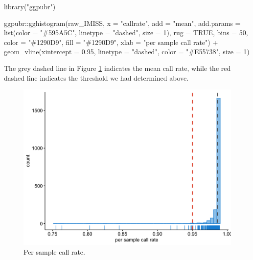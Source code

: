 \documentclass[
]{book}
\newenvironment{Shaded}{\begin{snugshade}}{\end{snugshade}}
\newcommand{\AttributeTok}[1]{\textcolor[rgb]{0.77,0.63,0.00}{#1}}
\newcommand{\ConstantTok}[1]{\textcolor[rgb]{0.00,0.00,0.00}{#1}}
\newcommand{\DecValTok}[1]{\textcolor[rgb]{0.00,0.00,0.81}{#1}}
\newcommand{\FloatTok}[1]{\textcolor[rgb]{0.00,0.00,0.81}{#1}}
\newcommand{\FunctionTok}[1]{\textcolor[rgb]{0.00,0.00,0.00}{#1}}
\newcommand{\NormalTok}[1]{#1}
\newcommand{\SpecialCharTok}[1]{\textcolor[rgb]{0.00,0.00,0.00}{#1}}
\newcommand{\StringTok}[1]{\textcolor[rgb]{0.31,0.60,0.02}{#1}}
\begin{document}
\begin{Shaded}
\begin{Highlighting}[]
\FunctionTok{library}\NormalTok{(}\StringTok{"ggpubr"}\NormalTok{)}

\NormalTok{ggpubr}\SpecialCharTok{::}\FunctionTok{gghistogram}\NormalTok{(raw\_IMISS, }\AttributeTok{x =} \StringTok{"callrate"}\NormalTok{,}
                    \AttributeTok{add =} \StringTok{"mean"}\NormalTok{, }\AttributeTok{add.params =} \FunctionTok{list}\NormalTok{(}\AttributeTok{color =} \StringTok{"\#595A5C"}\NormalTok{, }\AttributeTok{linetype =} \StringTok{"dashed"}\NormalTok{, }\AttributeTok{size =} \DecValTok{1}\NormalTok{),}
                    \AttributeTok{rug =} \ConstantTok{TRUE}\NormalTok{, }\AttributeTok{bins =} \DecValTok{50}\NormalTok{,}
                    \AttributeTok{color =} \StringTok{"\#1290D9"}\NormalTok{, }\AttributeTok{fill =} \StringTok{"\#1290D9"}\NormalTok{,}
                    \AttributeTok{xlab =} \StringTok{"per sample call rate"}\NormalTok{) }\SpecialCharTok{+}
  \FunctionTok{geom\_vline}\NormalTok{(}\AttributeTok{xintercept =} \FloatTok{0.95}\NormalTok{, }\AttributeTok{linetype =} \StringTok{"dashed"}\NormalTok{,}
                \AttributeTok{color =} \StringTok{"\#E55738"}\NormalTok{, }\AttributeTok{size =} \DecValTok{1}\NormalTok{)}
\end{Highlighting}
\end{Shaded}

The grey dashed line in Figure \ref{fig:show-sample-callrate} indicates the mean call rate, while the red dashed line indicates the threshold we had determined above.

\begin{figure}

{\centering \includegraphics[width=18.67in]{img/_gwas/sample-callrate} 

}

\caption{Per sample call rate.}\label{fig:show-sample-callrate}
\end{figure}
\end{document}
